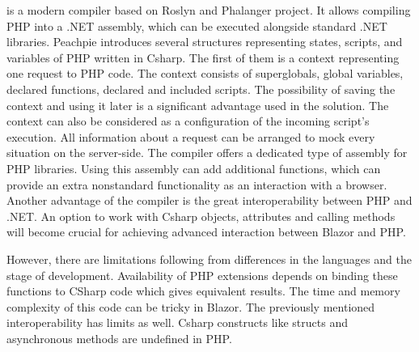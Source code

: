 \cite{Peachpie} is a modern compiler based on Roslyn and Phalanger project.
It allows compiling PHP into a .NET assembly, which can be executed alongside standard .NET libraries.
Peachpie introduces several structures representing states, scripts, and variables of PHP written in Csharp.
The first of them is a context representing one request to PHP code.
The context consists of superglobals, global variables, declared functions, declared and included scripts.
The possibility of saving the context and using it later is a significant advantage used in the solution.
The context can also be considered as a configuration of the incoming script's execution.
All information about a request can be arranged to mock every situation on the server-side.
The compiler offers a dedicated type of assembly for PHP libraries.
Using this assembly can add additional functions, which can provide an extra nonstandard functionality as an interaction with a browser.
Another advantage of the compiler is the great interoperability between PHP and .NET.
An option to work with Csharp objects, attributes and calling methods will become crucial for achieving advanced interaction between Blazor and PHP.

However, there are limitations following from differences in the languages and the stage of development.
Availability of PHP extensions depends on binding these functions to CSharp code which gives equivalent results. The time and memory complexity of this code can be tricky in Blazor.
The previously mentioned interoperability has limits as well.
Csharp constructs like structs and asynchronous methods are undefined in PHP.


